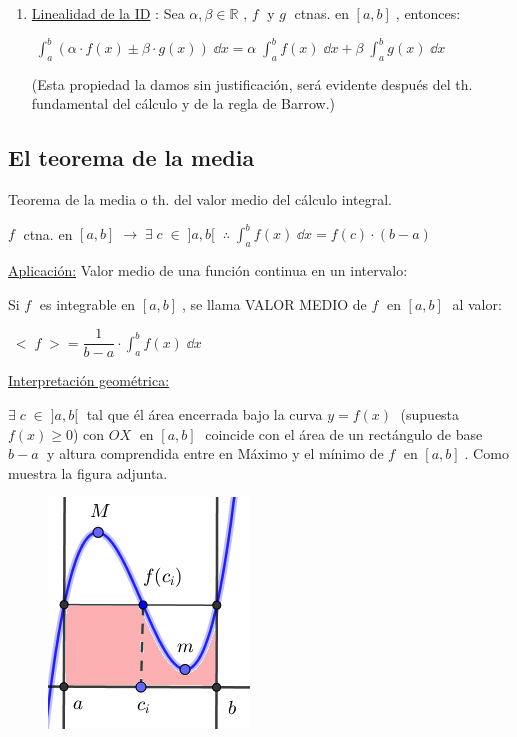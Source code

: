 \begin{enumerate}
	\vspace{-3mm} \emph{Las propiedades $3$ y $4$ permiten extender el concepto de integral definida (ID) a funciones definidas a trozos, incluso con discontinuidades finitas (discont. de salto y evitables). }
	
	\item \underline{Linealidad de la ID} : Sea $\alpha, \beta \in \mathbb R$\; , $f\; $ y $g\; $ ctnas. en $[a,b]\; $, entonces:
	
	\hspace{15mm} $\boxed{ \; \displaystyle \int_a^b \left(\alpha \cdot f(x) \pm \beta \cdot g(x)  \right)\; \dd x = \alpha \; \int_a^b f(x)\; \dd x +\beta \;  \int_a^b g(x)\; \dd x \; } $
	
	\textcolor{gris}{ (Esta propiedad la damos sin justificación, será evidente después del th. fundamental del cálculo y de la regla de Barrow.)}
\end{enumerate}

\subsection{El teorema de la media}

\begin{teor}{Teorema de la media o th. del valor medio del cálculo integral.}

$f\; $ ctna. en $[a,b]\; \to \; \exists \; c \; \in \; ]a,b[ \;\;  \therefore  \; \displaystyle \int_a^b f(x)\; \dd x = f(c)\cdot (b-a)\; $
\end{teor}

\underline{Aplicación:} Valor medio de una función continua en un intervalo:

Si $f\;$ es integrable en $[a,b]\; $, se llama VALOR MEDIO de $f\; $ en  $[a,b]\; $ al valor:

$\; <\; f \; > = \dfrac {1}{b-a }\cdot \displaystyle \int_a^b f(x)\; \dd x \; $
\begin{multicols}{2}
\underline{Interpretación geométrica:} 

$ \exists \; c \; \in \; ]a,b[ \;$ tal que él área encerrada bajo la curva $y=f(x)\; $ (supuesta $f(x)\ge 0$) con $OX\; $ en $[a,b]\; $ coincide con el área de un rectángulo de base $b-a\;$ y altura comprendida entre en Máximo y el mínimo de $f\; $ en $[a,b]\; $. Como muestra la figura adjunta.

\begin{figure}[H]
 	\centering
	\includegraphics[width=.25\textwidth]{imagenes/imagenes08/T08IM07.png}
\end{figure}
\end{multicols}



